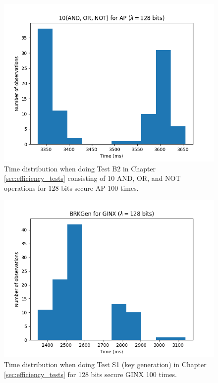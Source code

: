 \begin{figure}[ht]
    \centering
    \includegraphics[width=0.8\linewidth]{data/figures/AP_STD128_10AND_OR_NOT.png}
    \caption{Time distribution when doing Test B2 in Chapter \ref{sec:efficiency_tests} consisting of 10 AND, OR, and NOT operations for 128 bits secure AP 100 times.}
    \label{fig:distr_ap128_10}
\end{figure}

\begin{figure}[ht]
    \centering
    \includegraphics[width=0.8\linewidth]{data/figures/GINX_STD128_BRKGen.png}
    \caption{Time distribution when doing Test S1 (key generation) in Chapter \ref{sec:efficiency_tests} for 128 bits secure GINX 100 times.}
    \label{fig:distr_ginx128_keygen}
\end{figure}

